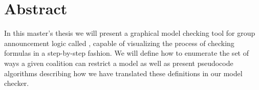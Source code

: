 \section*{Abstract}

In this master's thesis we will present a graphical model checking tool for group announcement logic called \cname, capable of visualizing the process of checking formulas in a step-by-step fashion. We will define how to enumerate the set of ways a given coalition can restrict a model as well as present pseudocode algorithms describing how we have translated these definitions in our model checker. 

